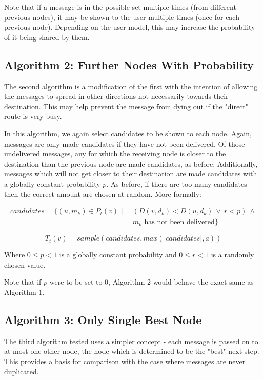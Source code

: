 \documentclass[bsc,frontabs,twoside,singlespacing,parskip,deptreport]{infthesis}     %
\begin{document}
Note that if a message is in the possible set multiple times (from different previous nodes), it may be shown to the user multiple times (once for each previous node). Depending on the user model, this may increase the probability of it being shared by them.

\subsection{Algorithm 2: Further Nodes With Probability}
The second algorithm is a modification of the first with the intention of allowing the messages to spread in other directions not necessarily towards their destination. This may help prevent the message from dying out if the "direct" route is very busy.

In this algorithm, we again select candidates to be shown to each node. Again, messages are only made candidates if they have not been delivered. Of those undelivered messages, any for which the receiving node is closer to the destination than the previous node are made candidates, as before. Additionally, messages which will not get closer to their destination are made candidates with a globally constant probability $p$. As before, if there are too many candidates then the correct amount are chosen at random. More formally:

\begin{equation}
\begin{split}
candidates = \{ (u, m_{k}) \in P_{t}(v) \:\: | \:\: & (D(v, d_{k}) < D(u, d_{k}) \: \vee \: r < p) \: \wedge \\
& m_{k} \mbox{ has not been delivered} \}
\end{split}
\end{equation}

\begin{equation}
T_{t}(v) = sample(candidates, max(|candidates|, a))
\end{equation}

Where $0 \leq p < 1$ is a globally constant probability and $0 \leq r < 1$ is a randomly chosen value.

Note that if $p$ were to be set to 0, Algorithm 2 would behave the exact same as Algorithm 1.

\subsection{Algorithm 3: Only Single Best Node}
The third algorithm tested uses a simpler concept - each message is passed on to at most one other node, the node which is determined to be the "best" next step. This provides a basis for comparison with the case where messages are never duplicated.
\end{document}
